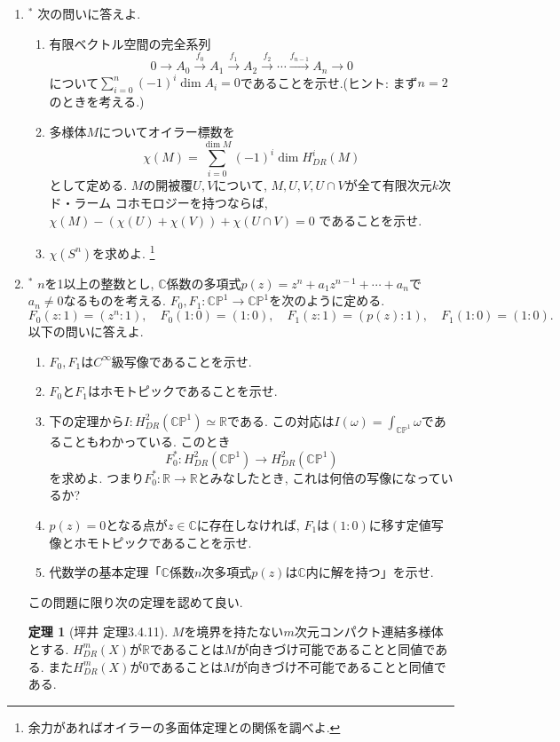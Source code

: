 \documentclass[dvipdfmx,a4paper,11pt]{article}
\newcommand{\R}{\mathbb{R}}
\newcommand{\C}{\mathbb{C}}
\theoremstyle{definition}
\newtheorem{thm}{定理}
\begin{document}
\begin{enumerate}[label=\textbf{問}\ref*{sec-deRham}.\arabic*]
\item $^{*}$ 次の問いに答えよ.
\begin{enumerate}
 \setlength{\parskip}{0cm}
  \setlength{\itemsep}{2pt}
\item 有限ベクトル空間の完全系列
$$
0 \to A_0 \stackrel{f_0}{\to} A_1 \stackrel{f_1}{\to} A_2 \stackrel{f_2}{\to}  \cdots \stackrel{f_{n-1}}{\to} A_{n} \to 0
$$
について$\sum_{i=0}^{n} (-1)^i \dim A_i =0$であることを示せ.(ヒント: まず$n=2$のときを考える.)
\item 多様体$M$についてオイラー標数を
$$
\chi (M) = \sum_{i=0}^{\dim M} (-1)^i \dim H^{i}_{DR}(M)
$$
として定める. 
$M$の開被覆$U, V$について, $M, U,V, U\cap V$が全て有限次元$k$次ド・ラーム コホモロジーを持つならば, 
$
\chi(M) - (\chi(U) + \chi(V) ) + \chi (U \cap V) =0
$
であることを示せ. 
\item $\chi(S^n)$を求めよ. \footnote{余力があればオイラーの多面体定理との関係を調べよ. }

\end{enumerate}

\item \label{fund_alg} $^{*}$ $n$を1以上の整数とし, $\C$係数の多項式$p(z) = z^n + a_{1}z^{n-1} + \cdots + a_n$で$a_n\neq 0$なるものを考える. 
$F_0, F_1 : \C\mathbb{P}^1 \to  \C\mathbb{P}^1$を次のように定める. 
$$
F_0 (z: 1) = (z^n : 1), \quad F_0 (1: 0) = (1 : 0), \quad F_1 (z: 1) = (p(z) : 1), \quad F_1(1: 0) = (1 : 0).
$$
以下の問いに答えよ. 
\begin{enumerate}
 \setlength{\parskip}{0cm}
  \setlength{\itemsep}{2pt}
  \item $F_0, F_1$は$C^{\infty}$級写像であることを示せ.
  \item $F_0$と$F_1$はホモトピックであることを示せ. 
 \item 下の定理から$I : H^{2}_{DR}(\C\mathbb{P}^1) \simeq \R$である.  この対応は$I(\omega) = \int_{\C\mathbb{P}^1} \omega$であることもわかっている. このとき
 $$
F_{0}^{*}:  H^{2}_{DR}(\C\mathbb{P}^1) \to  H^{2}_{DR}(\C\mathbb{P}^1)
 $$ 
 を求めよ. つまり$F_{0}^{*}: \R \to \R$とみなしたとき, これは何倍の写像になっているか? 
 \item $p(z) =0$となる点が$z \in \C$に存在しなければ, $F_1$は$(1:0)$に移す定値写像とホモトピックであることを示せ.
 \item 代数学の基本定理「$\C$係数$n$次多項式$p(z)$は$\C$内に解を持つ」を示せ. 
\end{enumerate}
この問題に限り次の定理を認めて良い. 
\begin{tcolorbox}[
    colback = white,
    colframe = green!35!black,
    fonttitle = \bfseries,
    breakable = true]
\begin{thm}[坪井 定理3.4.11]
$M$を境界を持たない$m$次元コンパクト連結多様体とする. 
$H^{m}_{DR}(X)$が$\R$であることは$M$が向きづけ可能であることと同値である. 
また$H^{m}_{DR}(X)$が$0$であることは$M$が向きづけ不可能であることと同値である. 
\end{thm}

\end{tcolorbox} 



\end{enumerate}









 
\end{document}
